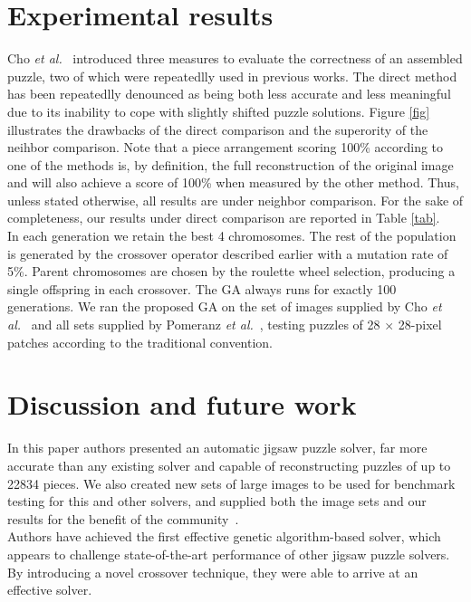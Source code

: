 \documentclass[10pt,twocolumn,letterpaper]{article}
\begin{document}
\section{Experimental results}
Cho \emph{et al.}~\cite{Probabilistic} introduced three measures to evaluate the correctness of an assembled puzzle, two of which were repeatedlly used in previous works. The direct method has been repeatedlly denounced \cite{Fully} as being both less accurate and less meaningful due to its inability to cope with slightly shifted puzzle solutions. Figure \ref{fig} illustrates the drawbacks of the direct comparison and the superority of the neihbor comparison. Note that a piece arrangement scoring 100\% according to one of the methods is, by definition, the full reconstruction of the original image and will also achieve a score of 100\% when measured by the other method. Thus, unless stated otherwise, all results are under neighbor comparison. For the sake of completeness, our results under direct comparison are reported in Table \ref{tab}.\\
\balance
In each generation we retain the best 4 chromosomes. The rest of the population is generated by the crossover operator described earlier with a mutation rate of 5\%. Parent chromosomes are chosen by the roulette wheel selection, producing a single offspring in each crossover. The GA always runs for exactly 100 generations. We ran the proposed GA on the set of images supplied by Cho \emph{et al.}~\cite{Probabilistic} and all sets supplied by Pomeranz \emph{et al.}~\cite{Fully}, testing puzzles of 28 $\times$ 28-pixel patches according to the traditional convention.
\section{Discussion and future work}
In this paper authors presented an automatic jigsaw puzzle solver, far more accurate than any existing solver and capable of reconstructing puzzles of up to 22834 pieces. We also created new sets of large images to be used for benchmark testing for this and other solvers, and supplied both the image sets and our results for the benefit of the community~\cite{Datasets}.\\
Authors have achieved the first effective genetic algorithm-based solver, which appears to challenge state-of-the-art performance of other jigsaw puzzle solvers. By introducing a novel crossover technique, they were able to arrive at an effective solver.
{\small


}
\end{document}
